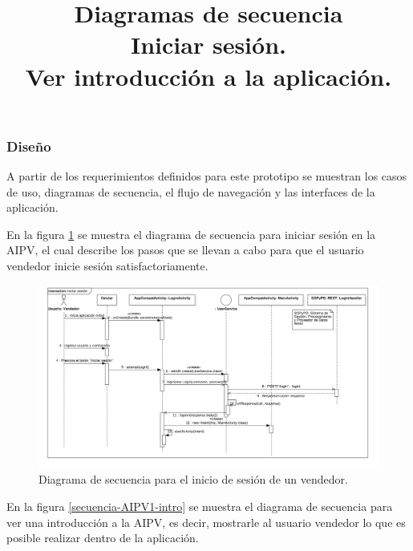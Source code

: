 \subsubsection{Diseño}

A partir de los requerimientos definidos para este prototipo se muestran los casos de uso, diagramas de secuencia, el flujo de navegación y las interfaces de la aplicación.\\ \par

\title{\textbf{Diagramas de secuencia}\\}

\title{\textbf{Iniciar sesión.}\\}

En la figura \ref{secuencia-AIPV1-inicio} se muestra el diagrama de secuencia para iniciar sesión en la AIPV, el cual describe los pasos que se llevan  a cabo para que el usuario vendedor inicie sesión satisfactoriamente.

\FloatBarrier
\begin{figure}[htbp!]
		\centering
			\includegraphics[width=1.1 \textwidth]{imagenes/adrian/vendedor/prototipo1/inicio_de_sesion}
		\caption{Diagrama de secuencia para el inicio de sesión de un vendedor.}
		\label{secuencia-AIPV1-inicio}
\end{figure}
\FloatBarrier


\title{\textbf{Ver introducción a la aplicación.}\\}

En la figura \ref{secuencia-AIPV1-intro} se muestra el diagrama de secuencia para ver una introducción a la AIPV, es decir, mostrarle al usuario vendedor lo que es posible realizar dentro de la aplicación.
 
